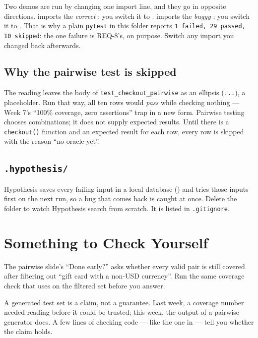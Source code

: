 \documentclass[11pt]{article}
\begin{document}
\begin{warningbox}
Two demos are run by changing one import line, and they go in opposite
directions.  imports the
\emph{correct} ; you switch it to
.  imports the
\emph{buggy} ; you switch it to .
That is why a plain \texttt{pytest} in this folder reports
\texttt{1 failed, 29 passed, 10 skipped}: the one failure is REQ-8's, on
purpose. Switch any import you changed back afterwards.
\end{warningbox}

\subsection*{Why the pairwise test is skipped}
The reading leaves the body of \texttt{test\_checkout\_pairwise} as an
ellipsis (\texttt{...}), a placeholder. Run that way, all ten rows would \emph{pass} while
checking nothing --- Week 7's ``100\% coverage, zero assertions'' trap
in a new form. Pairwise testing chooses combinations; it does not supply
expected results. Until there is a \texttt{checkout()} function and an
expected result for each row, every row is skipped with the reason
``no oracle yet''.

\subsection*{\texttt{.hypothesis/}}
Hypothesis saves every failing input in a local database
() and tries those inputs first on the next run, so
a bug that comes back is caught at once. Delete the folder to watch
Hypothesis search from scratch. It is listed in \texttt{.gitignore}.

\section{Something to Check Yourself}
The pairwise slide's ``Done early?'' asks whether every valid pair is
still covered after filtering out ``gift card with a non-USD currency''.
Run the same coverage check that  uses on the filtered
set before you answer.

\begin{keyidea}
A generated test set is a claim, not a guarantee. Last week, a coverage
number needed reading before it could be trusted; this week, the
output of a pairwise generator does. A few lines of checking code ---
like the one in  --- tell you whether the claim holds.
\end{keyidea}
\end{document}
